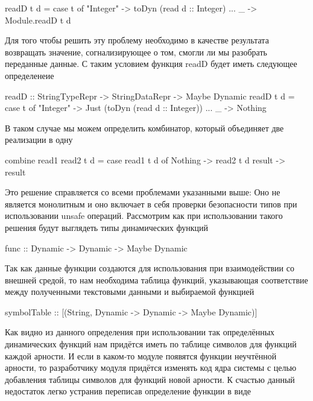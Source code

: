 \begin{code}
  readD t d = case t of
                "Integer" -> toDyn (read d :: Integer)
                ...
                _  -> Module.readD t d
\end{code}

Для того чтобы решить эту проблему необходимо в качестве результата
возвращать значение, согнализирующее о том, смогли ли мы разобрать
переданные данные. С таким условием функция readD будет иметь
следующее определенеие

\begin{code}
  readD :: StringTypeRepr -> StringDataRepr -> Maybe Dynamic
  readD t d = case t of
                "Integer" -> Just (toDyn (read d :: Integer))
                ...
                _  -> Nothing
\end{code}

В таком случае мы можем определить комбинатор, который объединяет две
реализации в одну

\begin{code}
  combine read1 read2 t d = case read1 t d of
                              Nothing -> read2 t d
                              result  -> result
\end{code}

Это решение справляется со всеми проблемами указанными выше: Оно не
является монолитным и оно включает в себя проверки безопасности типов
при использовании unsafe операций. Рассмотрим как при использовании
такого решения будут выглядеть типы динамических функций

\begin{code}
  func :: Dynamic -> Dynamic -> Maybe Dynamic
\end{code}

Так как данные функции создаются для использования при взаимодействии
со внешней средой, то нам необходима таблица функций, указывающая
соответствие между полученными текстовыми данными и выбираемой
функцией

\begin{code}
  symbolTable :: [(String, Dynamic -> Dynamic -> Maybe Dynamic)]
\end{code}

Как видно из данного определения при использовании так определённых
динамических функций нам придётся иметь по таблице символов для
функций каждой арности. И если в каком-то модуле появятся функции
неучтённой арности, то разработчику модуля придётся изменять код ядра
системы с целью добавления таблицы символов для функций новой
арности. К счастью данный недостаток легко устранив переписав
определение функции в виде


